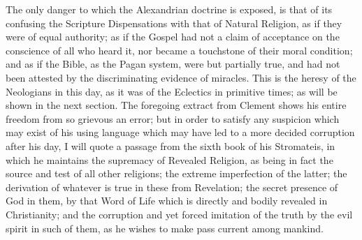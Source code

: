 The only danger to which the Alexandrian doctrine is exposed, is
that of its confusing the Scripture Dispensations with that of Natural
Religion, as if they were of equal authority; as if the Gospel had not
a claim of acceptance on the conscience of all who heard it, nor
became a touchstone of their moral condition; and as if the Bible, as
the Pagan system, were but partially true, and had not been attested
by the discriminating evidence of miracles. This is the heresy of the
Neologians in this day, as it was of the Eclectics in primitive times;
as will be shown in the next section. The foregoing extract from
Clement shows his entire freedom from so grievous an error; but in
order to satisfy any suspicion which may exist of his using language
which may have led to a more decided corruption after his day, I will
quote a passage from the sixth book of his Stromateis, in which he
maintains the supremacy of Revealed Religion, as being in fact the
source and test of all other religions; the extreme imperfection of
the latter; the derivation of whatever is true in these from
Revelation; the secret presence of God in them, by that Word of Life
which is directly and bodily revealed in Christianity; and the
corruption and yet forced imitation of the truth by the evil spirit in
such of them, as he wishes to make pass current among mankind.

